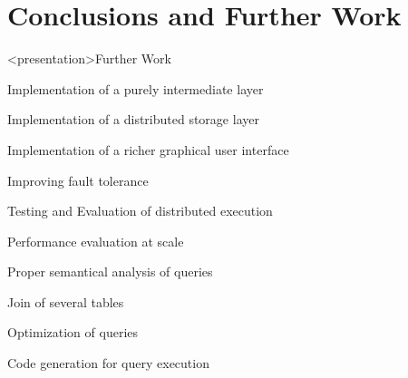 \section{Conclusions and Further Work}
\begin{frame}<presentation>{Further Work}
\begin{niitemize}
  \item Implementation of a purely intermediate layer
  \item Implementation of a distributed storage layer
  \item Implementation of a richer graphical user interface
  \item Improving fault tolerance
  \item Testing and Evaluation of distributed execution
  \item Performance evaluation at scale
  \item Proper semantical analysis of queries
  \item Join of several tables
  \item Optimization of queries
  \item Code generation for query execution
\end{niitemize}
\end{frame}


